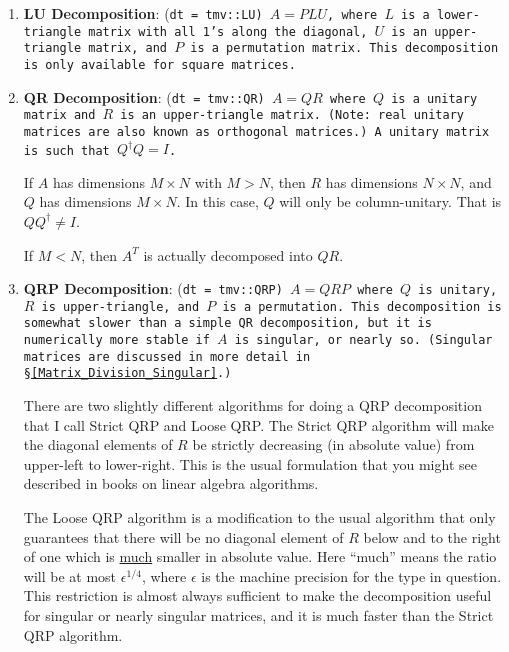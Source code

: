 \begin{enumerate}
\item
\textbf{LU Decomposition}: 
(\tt{dt} = \tt{tmv::LU}) $A = P L U$, where $L$ is a lower-triangle 
matrix with all 1's along the diagonal, $U$ is an upper-triangle matrix, 
and $P$ is a permutation matrix.  This decomposition is only available for 
square matrices.

\item
\textbf{QR Decomposition}: 
(\tt{dt} = \tt{tmv::QR}) $A = Q R$ where $Q$ is a unitary matrix
and $R$ is an upper-triangle matrix.  (Note: real unitary matrices are
also known as orthogonal matrices.)  A unitary matrix is such that
$Q^\dagger Q = I$. 

If $A$ has dimensions $M \times N$ with $M > N$, 
then $R$ has dimensions $N \times N$, and $Q$
has dimensions $M \times N$.  In this case, $Q$ will
only be column-unitary.  That is $Q Q^\dagger \neq I$.

If $M < N$, then $A^T$ is actually decomposed into $Q R$.

\item
\textbf{QRP Decomposition}: 
(\tt{dt} = \tt{tmv::QRP}) $A = Q R P$ where $Q$ is unitary, $R$ is 
upper-triangle, and $P$ is a permutation.  This decomposition is somewhat
slower than a simple QR decomposition, but it is numerically more stable if
$A$ is singular, or nearly so.  
(Singular matrices are discussed in more detail in \S\ref{Matrix_Division_Singular}.)

There are two slightly different algorithms for doing a QRP decomposition
that I call Strict QRP and Loose QRP.  The Strict QRP algorithm 
will make the diagonal elements
of $R$ be strictly decreasing (in absolute value) from upper-left to lower-right.
This is the usual formulation that you might see described in books on linear algebra algorithms.

The Loose QRP algorithm is a modification to the usual algorithm that only guarantees that there will be no diagonal element
of $R$ below and to the right of one which is \underline{much} smaller in absolute value.
Here ``much'' means the ratio will be at most $\epsilon^{1/4}$, where 
$\epsilon$ is the machine precision for the type in question.  This restriction
is almost always sufficient to make the decomposition useful for singular or nearly
singular matrices, and it is much faster than the Strict QRP algorithm.


\end{enumerate}
